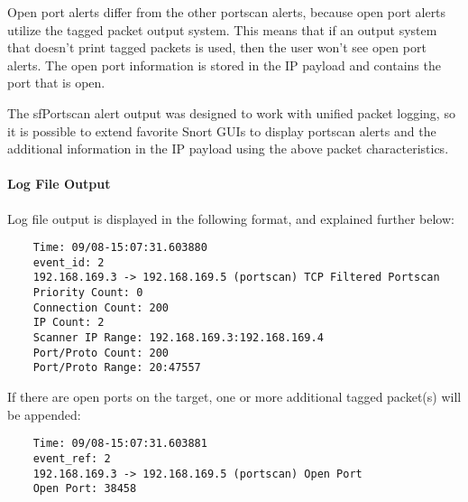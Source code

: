 \documentclass[english]{report}
\begin{document}
Open port alerts differ from the other portscan alerts, because open port
alerts utilize the tagged packet output system.  This means that if an output
system that doesn't print tagged packets is used, then the user won't see open
port alerts.  The open port information is stored in the IP payload and
contains the port that is open.

The sfPortscan alert output was designed to work with unified packet logging,
so it is possible to extend favorite Snort GUIs to display portscan alerts and
the additional information in the IP payload using the above packet
characteristics.

\paragraph{Log File Output}

Log file output is displayed in the following format, and explained further
below:

\begin{verbatim}
    Time: 09/08-15:07:31.603880
    event_id: 2
    192.168.169.3 -> 192.168.169.5 (portscan) TCP Filtered Portscan
    Priority Count: 0
    Connection Count: 200
    IP Count: 2
    Scanner IP Range: 192.168.169.3:192.168.169.4
    Port/Proto Count: 200
    Port/Proto Range: 20:47557
\end{verbatim}

If there are open ports on the target, one or more additional tagged packet(s)
will be appended:

\begin{verbatim}
    Time: 09/08-15:07:31.603881
    event_ref: 2
    192.168.169.3 -> 192.168.169.5 (portscan) Open Port
    Open Port: 38458
\end{verbatim}
\end{document}
